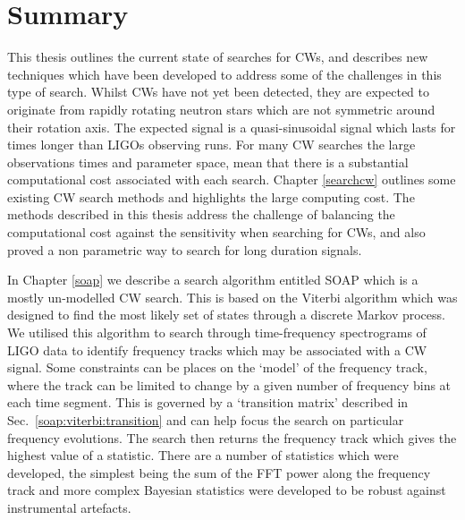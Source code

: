 \chapter{\label{summary}Summary}


This thesis outlines the current state of searches for \glspl{CW}, and describes new techniques which have been developed to address some of the challenges in this type of search.
Whilst \glspl{CW} have not yet been detected, they are expected to originate from rapidly rotating neutron stars which are not symmetric around their rotation axis.
The expected signal is a quasi-sinusoidal signal which lasts for times longer than \glspl{LIGO} observing runs.
For many \gls{CW} searches the large observations times and parameter space, mean that there is a substantial computational cost associated with each search. 
Chapter \ref{searchcw} outlines some existing \gls{CW} search methods and highlights the large computing cost.
The methods described in this thesis address the challenge of balancing the computational cost against the sensitivity when searching for \glspl{CW}, and also proved a non parametric way to search for long duration signals.

\bigskip

In Chapter \ref{soap} we describe a search algorithm entitled SOAP which is a mostly un-modelled \gls{CW} search. 
This is based on the Viterbi algorithm which was designed to find the most likely set of states through a discrete Markov process.
We utilised this algorithm to search through time-frequency spectrograms of \gls{LIGO} data to identify frequency tracks which may be associated with a \gls{CW} signal.
Some constraints can be places on the `model' of the frequency track, where the track can be limited to change by a given number of frequency bins at each time segment. 
This is governed by a `transition matrix' described in Sec.~\ref{soap:viterbi:transition} and can help focus the search on particular frequency evolutions.
The search then returns the frequency track which gives the highest value of a statistic.
There are a number of statistics which were developed, the simplest being the sum of the \gls{FFT} power along the frequency track and more complex Bayesian statistics were developed to be robust against instrumental artefacts.

